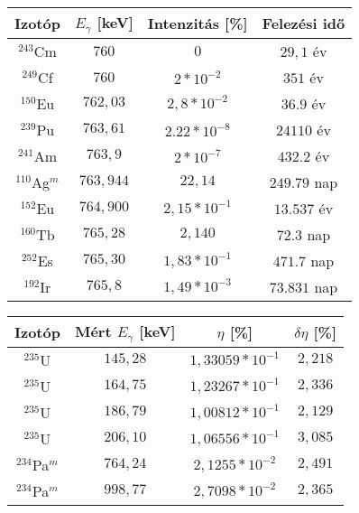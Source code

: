 \begin{center}
\begin{tabular}{|c|c|c|c|}
\hline
Izotóp 			 & $E_{\gamma}$ [keV] & Intenzitás [\%] & Felezési idő \\
\hline
$^{243}$Cm       & $760$     & $0$              & $29,1$ év    \\
$^{249}$Cf       & $760$     & $2 * 10^{-2}$    & $351$ év     \\
$^{150}$Eu       & $762,03$  & $2,8 * 10^{-2}$  & $36.9$ év    \\
$^{239}$Pu       & $763,61$  & $2.22 * 10^{-8}$ & $24110$ év   \\
$^{241}$Am       & $763,9$   & $2 * 10^{-7}$    & $432.2$ év   \\
$^{110}$Ag$^{m}$ & $763,944$ & $22,14$          & $249.79$ nap \\
$^{152}$Eu       & $764,900$ & $2,15 * 10^{-1}$ & $	13.537$ év \\
$^{160}$Tb       & $765,28$  & $2,140$          & $72.3$ nap   \\
$^{252}$Es       & $765,30$  & $1,83 * 10^{-1}$ & $471.7$ nap  \\
$^{192}$Ir       & $765,8$   & $1,49 * 10^{-3}$ & $73.831$ nap \\
\hline
\end{tabular}
 \label{table:2}
\end{center}

\begin{center}
\begin{tabular}{|c|c|c|c|}
\hline
Izotóp 			 & Mért $E_{\gamma}$ [keV] & $\eta$ [\%]          & $\delta \eta$ [\%] \\
\hline
$^{235}$U 		 & $145,28$                & $1,33059 * 10^{-1}$  & $2,218$            \\
$^{235}$U 		 & $164,75$ 	           & $1,23267 * 10^{-1}$  & $2,336$            \\
$^{235}$U 		 & $186,79$ 	           & $1,00812 * 10^{-1}$  & $2,129$            \\
$^{235}$U        & $206,10$ 	           & $1,06556 * 10^{-1}$  & $3,085$            \\
$^{234}$Pa$^{m}$ & $764,24$ 	           & $2,1255 * 10^{-2}$   & $2,491$            \\
$^{234}$Pa$^{m}$ & $998,77$ 	           & $2,7098 * 10^{-2}$   & $2,365$            \\
\hline
\end{tabular}
 \label{table:3}
\end{center}

